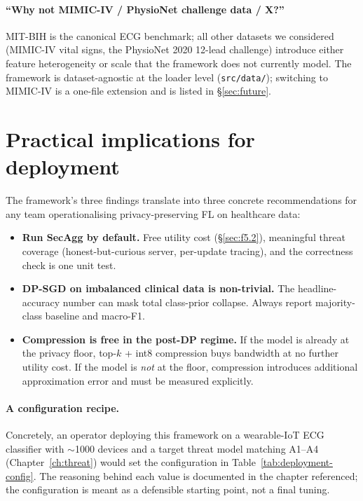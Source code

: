 \documentclass[11pt,a4paper]{report}
\begin{document}
\paragraph{``Why not MIMIC-IV / PhysioNet challenge data / X?''}
MIT-BIH is the canonical ECG benchmark; all other datasets we considered
(MIMIC-IV vital signs, the PhysioNet 2020 12-lead challenge) introduce
either feature heterogeneity or scale that the framework does not
currently model. The framework is dataset-agnostic at the loader level
(\texttt{src/data/}); switching to MIMIC-IV is a one-file extension and
is listed in \S\ref{sec:future}.

\section{Practical implications for deployment}

The framework's three findings translate into three concrete
recommendations for any team operationalising privacy-preserving FL on
healthcare data:

\begin{itemize}[leftmargin=*]
  \item \textbf{Run SecAgg by default.} Free utility cost (\S\ref{sec:f5.2}),
  meaningful threat coverage (honest-but-curious server,
  per-update tracing), and the correctness check is one unit test.
  \item \textbf{DP-SGD on imbalanced clinical data is non-trivial.}
  The headline-accuracy number can mask total class-prior collapse.
  Always report majority-class baseline and macro-F1.
  \item \textbf{Compression is free in the post-DP regime.} If the model
  is already at the privacy floor, top-$k$ + int8 compression buys
  bandwidth at no further utility cost. If the model is \emph{not} at
  the floor, compression introduces additional approximation error and
  must be measured explicitly.
\end{itemize}

\paragraph{A configuration recipe.}
Concretely, an operator deploying this framework on a wearable-IoT ECG
classifier with $\sim$1000 devices and a target threat model matching
A1--A4 (Chapter~\ref{ch:threat}) would set the configuration in
Table~\ref{tab:deployment-config}. The reasoning behind each value is
documented in the chapter referenced; the configuration is meant as a
defensible starting point, not a final tuning.
\end{document}
